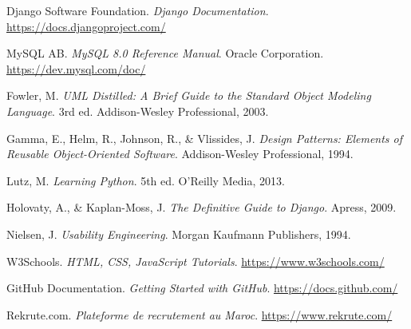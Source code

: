 \documentclass[12pt,a4paper]{report}
\begin{document}
\begin{enumerate}[leftmargin=*, label={[\arabic*]}]
  \item Django Software Foundation. \textit{Django Documentation}. \url{https://docs.djangoproject.com/}
  \item MySQL AB. \textit{MySQL 8.0 Reference Manual}. Oracle Corporation. \url{https://dev.mysql.com/doc/}
  \item Fowler, M. \textit{UML Distilled: A Brief Guide to the Standard Object Modeling Language}. 3rd ed. Addison-Wesley Professional, 2003.
  \item Gamma, E., Helm, R., Johnson, R., \& Vlissides, J. \textit{Design Patterns: Elements of Reusable Object-Oriented Software}. Addison-Wesley Professional, 1994.
  \item Lutz, M. \textit{Learning Python}. 5th ed. O'Reilly Media, 2013.
  \item Holovaty, A., \& Kaplan-Moss, J. \textit{The Definitive Guide to Django}. Apress, 2009.
  \item Nielsen, J. \textit{Usability Engineering}. Morgan Kaufmann Publishers, 1994.
  \item W3Schools. \textit{HTML, CSS, JavaScript Tutorials}. \url{https://www.w3schools.com/}
  \item GitHub Documentation. \textit{Getting Started with GitHub}. \url{https://docs.github.com/}
  \item Rekrute.com. \textit{Plateforme de recrutement au Maroc}. \url{https://www.rekrute.com/}
\end{enumerate}
\end{document}
